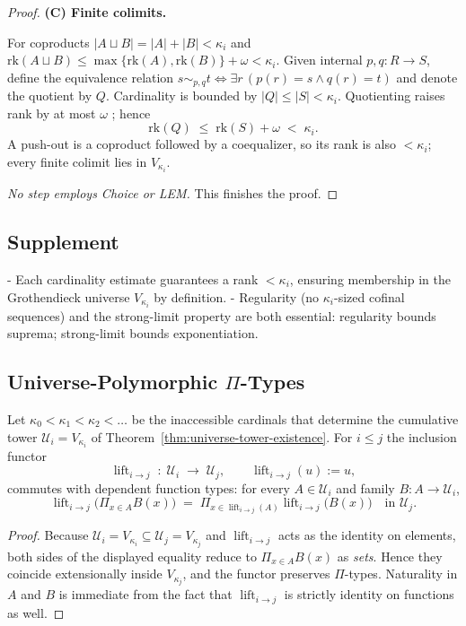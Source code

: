 \documentclass[a4paper,11pt]{article}
\newcommand{\lift}{\operatorname{lift}}      %
\begin{document}
\begin{proof}
\smallskip
\textbf{(C) Finite colimits.}

For coproducts
$
  |A\sqcup B|=|A|+|B|<\kappa_i
$
and
$
  \mathrm{rk}(A\sqcup B)
  \le\max\{\mathrm{rk}(A),\mathrm{rk}(B)\}+\omega<\kappa_i .
$
Given internal $p,q:R\to S$, define the equivalence relation
$s\sim_{p,q}t\iff\exists r\,(p(r)=s\wedge q(r)=t)$ and denote the
quotient by $Q$.  Cardinality is bounded by
\(
  |Q|\le |S|<\kappa_i .
\)
Quotienting raises rank by at most $\omega$
\cite[Ex.\ 2.15]{Lurie:HTT}; hence
\begin{equation}\label{star4}
  \mathrm{rk}(Q)
  \;\le\;
  \mathrm{rk}(S)+\omega
  \;<\;\kappa_i .
\end{equation}
A push-out is a coproduct followed by a coequalizer, so its rank is
also $<\kappa_i$; every finite colimit lies in $V_{\kappa_i}$.

\smallskip
\emph{No step employs Choice or LEM.}  This finishes the proof.
\end{proof}


\subsection*{Supplement}
- Each cardinality estimate guarantees a rank $<\kappa_{i}$,
  ensuring membership in the Grothendieck universe  
  $V_{\kappa_{i}}$ by definition.  
- Regularity (no $\kappa_{i}$-sized cofinal sequences) and the
  strong-limit property are both essential:  
  regularity bounds suprema; strong-limit bounds exponentiation.



\subsection{Universe-Polymorphic $\Pi$-Types}
\begin{corollary}
\label{cor:lift-pi}
Let $\kappa_{0}<\kappa_{1}<\kappa_{2}<\dots$ be the inaccessible
cardinals that determine the cumulative tower
$\mathcal U_{i}=V_{\kappa_{i}}$ of
Theorem~\ref{thm:universe-tower-existence}.
For $i\le j$ the inclusion functor
\[
  \lift_{i\to j}\;\colon\;
     \mathcal U_{i}\;\longrightarrow\;\mathcal U_{j},
  \qquad
  \lift_{i\to j}(u):=u,
\]
commutes with dependent function types:
for every $A\in\mathcal U_{i}$ and family
$B\colon A\to\mathcal U_{i}$,
\[
  \lift_{i\to j}\!\bigl(\Pi_{x\in A}B(x)\bigr)
  \;=\;
  \Pi_{x\in\lift_{i\to j}(A)}
      \lift_{i\to j}\!\bigl(B(x)\bigr)
  \quad\text{in } \mathcal U_{j}.
\]
\end{corollary}
\begin{proof}
Because $\mathcal U_{i}=V_{\kappa_{i}}\subseteq
        \mathcal U_{j}=V_{\kappa_{j}}$ and
$\lift_{i\to j}$ acts as the identity on elements,
both sides of the displayed equality reduce to
$\Pi_{x\in A}B(x)$ as \emph{sets}.  
Hence they coincide extensionally inside $V_{\kappa_{j}}$,
and the functor preserves $\Pi$-types. Naturality in $A$ and $B$
is immediate from the fact that $\lift_{i\to j}$ is strictly
identity on functions as well.
\end{proof}
\end{document}
